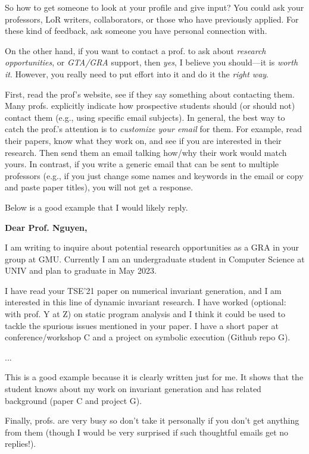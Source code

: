 \documentclass[oneside,11pt,dvipsnames]{book}
\newenvironment{commentbox}[1][]{
  \small
  \begin{mybox}
    {\small \textbf{#1}}
  }{
  \end{mybox}
}
\begin{document}
So how to get someone to look at your profile and give input? You could ask your professors, LoR writers, collaborators, or those who have previously applied. For these kind of feedback, ask someone you have personal connection with.

On the other hand, if you want to contact a prof. to ask about \emph{research opportunities}, or \emph{GTA/GRA} support, then \emph{yes}, I believe you should---it is \emph{worth it}. However, you really need to put effort into it and do it the \emph{right way}.

First, read the prof's website, see if they say something about contacting them. Many profs. explicitly indicate how prospective students should (or should not) contact them (e.g., using specific email subjects).
In general, the best way to catch the prof.'s attention is to \emph{customize your email} for them.  For example, read their papers, know what they work on, and see if you are interested in their research. Then send them an email talking how/why their work would match yours.
In contrast, if you write a generic email that can be sent to multiple professors (e.g., if you just change some names and keywords in the email or copy and paste paper titles), you will not get a response.

Below is a good example that I would likely reply.

\begin{commentbox}[Dear Prof. Nguyen,]

  I am writing to inquire about potential research opportunities as a GRA in your group at GMU. Currently I am an undergraduate student in Computer Science at UNIV and plan to graduate in May 2023.


  I have read your TSE'21 paper on numerical invariant generation, and I am interested in this line of dynamic invariant research. I have worked (optional: with prof. Y at Z) on static program analysis and I think it could be used to tackle the spurious issues mentioned in your paper. I have a short paper at conference/workshop C and a project on symbolic execution (Github repo G).

  ...

  This is a good example because it is clearly written just for me.  It shows that the student knows about my work on invariant generation and has related  background (paper C and project G).
\end{commentbox}

Finally, profs. are very busy so don't take it personally if you don't get anything from them (though I would be very surprised if such thoughtful emails get no replies!).
\end{document}
